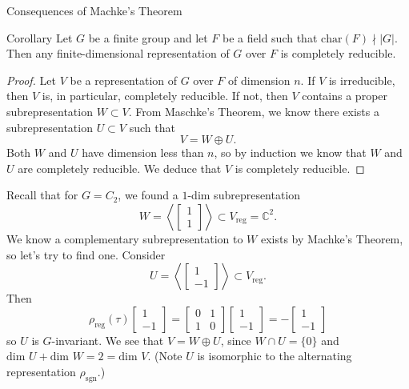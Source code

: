 \begin{frame}{Consequences of Machke's Theorem}
\begin{block}{Corollary}
Let $G$ be a finite group and let $F$ be a field such that $\text{char}(F) \nmid |G|$. Then any finite-dimensional representation of $G$ over $F$ is completely reducible.
\end{block}
\begin{proof}
Let $V$ be a representation of $G$ over $F$ of dimension $n$.  If $V$ is irreducible, then $V$ is, in particular, completely reducible.  If not, then $V$ contains a proper subrepresentation $W \subset V$.  From Maschke's Theorem, we know there exists a subrepresentation $U \subset V$ such that 
\begin{equation}  V = W \oplus U. \end{equation}
Both $W$ and $U$ have dimension less than $n$, so by induction we know that $W$ and $U$ are completely reducible. We deduce that $V$ is completely reducible.
\end{proof}
\end{frame}

\begin{frame}
\begin{example}
Recall that for  $G= C_2$, we found a $1$-dim subrepresentation 
\[ W = \left< \begin{bmatrix}1 \\ 1 \end{bmatrix} \right> \subset V_{\text{reg}}= \mathbb{C}^2 . \]
We know a complementary subrepresentation to $W$ exists by Machke's Theorem, so let's try to find one.  Consider
\[ U =  \left< \begin{bmatrix}1 \\ -1 \end{bmatrix} \right> \subset V_{\text{reg}}. \]
Then
\[ \rho_{\text{reg}}(\tau) \begin{bmatrix}1 \\ -1 \end{bmatrix} =  \begin{bmatrix} 0 & 1 \\ 1 & 0 \end{bmatrix} \begin{bmatrix}1 \\ -1 \end{bmatrix} = -  \begin{bmatrix}1 \\ -1 \end{bmatrix} \]
so $U$ is $G$-invariant.  We see that $V = W \oplus U$, since $W \cap U = \{ 0 \}$ and $\text{dim } U + \text{dim } W = 2 = \text{dim } V$.   (Note $U$ is isomorphic to the alternating representation $\rho_{\text{sgn}}$.)
\end{example}
\end{frame}

